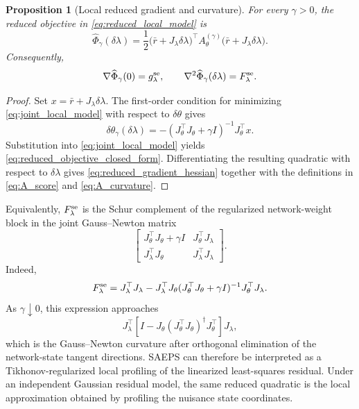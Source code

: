 \documentclass[preprint,12pt]{elsarticle}
\newtheorem{proposition}{Proposition}
\begin{document}
\begin{proposition}[Local reduced gradient and curvature]
\label{prop:reduced_gradient_curvature}
For every $\gamma>0$, the reduced objective in \eqref{eq:reduced_local_model} is
\begin{equation}
\widehat\Phi_\gamma(\delta\lambda)
=
\frac12
\bigl(\bar r+J_\lambda\delta\lambda\bigr)^\top
A_\theta^{(\gamma)}
\bigl(\bar r+J_\lambda\delta\lambda\bigr).
\label{eq:reduced_objective_closed_form}
\end{equation}
Consequently,
\begin{equation}
\nabla\widehat\Phi_\gamma(0)=g_\lambda^{\rm se},
\qquad
\nabla^2\widehat\Phi_\gamma(\delta\lambda)=F_\lambda^{\rm se}.
\label{eq:reduced_gradient_hessian}
\end{equation}
\end{proposition}

\begin{proof}
Set $x=\bar r+J_\lambda\delta\lambda$.  The first-order condition for minimizing \eqref{eq:joint_local_model} with respect to $\delta\theta$ gives
\[
\delta\theta_\gamma(\delta\lambda)
=-(J_\theta^\top J_\theta+\gamma I)^{-1}J_\theta^\top x.
\]
Substitution into \eqref{eq:joint_local_model} yields \eqref{eq:reduced_objective_closed_form}.  Differentiating the resulting quadratic with respect to $\delta\lambda$ gives \eqref{eq:reduced_gradient_hessian} together with the definitions in \eqref{eq:A_score} and \eqref{eq:A_curvature}.
\end{proof}

Equivalently, $F_\lambda^{\rm se}$ is the Schur complement of the regularized network-weight block in the joint Gauss--Newton matrix
\begin{equation}
\begin{bmatrix}
J_\theta^\top J_\theta+\gamma I & J_\theta^\top J_\lambda\\
J_\lambda^\top J_\theta & J_\lambda^\top J_\lambda
\end{bmatrix}.
\label{eq:joint_regularized_gn}
\end{equation}
Indeed,
\begin{equation}
F_\lambda^{\rm se}
=
J_\lambda^\top J_\lambda
-
J_\lambda^\top J_\theta
(J_\theta^\top J_\theta+\gamma I)^{-1}
J_\theta^\top J_\lambda.
\label{eq:regularized_schur_complement}
\end{equation}
As $\gamma\downarrow0$, this expression approaches
\begin{equation}
J_\lambda^\top
\left[I-J_\theta(J_\theta^\top J_\theta)^\dagger J_\theta^\top\right]
J_\lambda,
\label{eq:undamped_reduced_curvature}
\end{equation}
which is the Gauss--Newton curvature after orthogonal elimination of the network-state tangent directions.  SAEPS can therefore be interpreted as a Tikhonov-regularized local profiling of the linearized least-squares residual.  Under an independent Gaussian residual model, the same reduced quadratic is the local approximation obtained by profiling the nuisance state coordinates.
\end{document}
